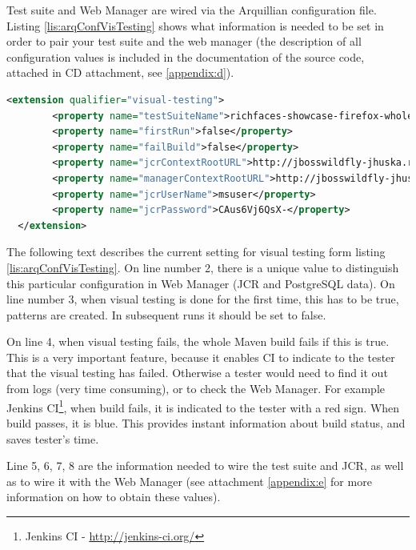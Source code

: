 \documentclass[11pt,oneside,final]{fithesis2}
\begin{document}
  Test suite and Web Manager are wired via the Arquillian configuration file. Listing \ref{lis:arqConfVisTesting} shows what information is needed 
  to be set in order to pair your test suite and the web manager (the description of all configuration values is included in the documentation
  of the source code, attached in CD attachment, see \ref{appendix:d}).
  
  \begin{lstlisting}[caption=Example of configuration for Graphene Visual Testing Extension,label=lis:arqConfVisTesting,breaklines=true, language=xml]
  <extension qualifier="visual-testing">
        <property name="testSuiteName">richfaces-showcase-firefox-whole</property>      
        <property name="firstRun">false</property>
        <property name="failBuild">false</property>
        <property name="jcrContextRootURL">http://jbosswildfly-jhuska.rhcloud.com/modeshape-rest/graphene-visual-testing/default</property>
        <property name="managerContextRootURL">http://jbosswildfly-jhuska.rhcloud.com/</property>
        <property name="jcrUserName">msuser</property>
        <property name="jcrPassword">CAus6Vj6QsX-</property>
  </extension>
  \end{lstlisting}
  
  The following text describes the current setting for visual testing form listing \ref{lis:arqConfVisTesting}. 
  On line number 2, there is a unique value to distinguish this particular configuration in Web Manager (JCR and PostgreSQL data).
  On line number 3, when visual testing is done for the first time, this has to be true, patterns are created. In subsequent runs it should be set to
  false. 
  
  On line 4, when visual testing fails, the whole Maven build fails if this is true. This is a very important feature, because it enables
  CI to indicate to the tester that the visual testing has failed. Otherwise a tester would need to find it out from logs (very time consuming),
  or to check the Web Manager. For example Jenkins CI\footnote{Jenkins CI - \url{http://jenkins-ci.org/}}, when build fails, it is indicated to the
  tester with a red sign. When build passes, it is blue. This provides instant information about build status, and saves tester's time.
  
  Line 5, 6, 7, 8 are the information needed to wire the test suite and JCR, as well as to wire it with the Web Manager (see attachment \ref{appendix:e}
  for more information on how to obtain these values).
  
\end{document}
